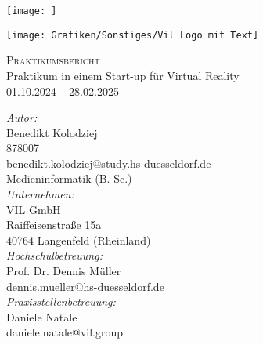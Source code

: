\begin{titlepage}
    \thispagestyle{empty}

    \vspace*{1cm} %
    \begin{minipage}{0.45\textwidth}
        \raggedright
        \texttt{[image: ]} %
    \end{minipage}%
    \hfill
    \begin{minipage}{0.45\textwidth}
        \raggedleft
        \texttt{[image: Grafiken/Sonstiges/Vil Logo mit Text]} %
    \end{minipage}

    \vspace{1.5cm} %

    \center

    \textsc{\large Praktikumsbericht}\\
    \vspace{0.5cm}
    \Large{Praktikum in einem Start-up für Virtual Reality}\\
    \small{01.10.2024 – 28.02.2025}
    \vspace{2cm}

    \begin{center}
        \textit{Autor:} \\
        Benedikt Kolodziej \\
        878007 \\
        benedikt.kolodziej@study.hs-duesseldorf.de   \\
        Medieninformatik (B. Sc.) \\[1cm]

        \textit{Unternehmen:} \\
        VIL GmbH\\
        Raiffeisenstraße 15a \\
        40764 Langenfeld (Rheinland) \\[1cm]

        \textit{Hochschulbetreuung:} \\
        Prof. Dr. Dennis Müller\\
        dennis.mueller@hs-duesseldorf.de \\[1cm]

        \textit{Praxisstellenbetreuung:} \\
        Daniele Natale \\
        daniele.natale@vil.group
    \end{center}


\end{titlepage}
